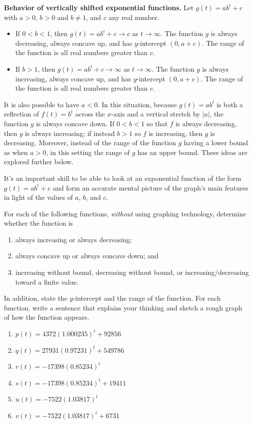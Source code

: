 \documentclass[nooutcomes]{ximera}
\begin{document}
\begin{callout}
\textbf{\Large Behavior of vertically shifted exponential functions.}
Let $g(t) = ab^t + c$ with $a > 0$, $b > 0$ and $b \ne 1$, and $c$ any real number.
\begin{itemize}
\item If $0 < b < 1$, then $g(t) = ab^t + c \to c$ as $t \to \infty$.  The function $g$ is always decreasing, always concave up, and has $y$-intercept $(0,a+c)$.  The range of the function is all real numbers greater than $c$.
\item If $b > 1$, then $g(t) = ab^t + c \to \infty$ as $t \to \infty$.  The function $g$ is always increasing, always concave up, and has $y$-intercept $(0,a+c)$.  The range of the function is all real numbers greater than $c$.
\end{itemize}
\end{callout}


It is also possible to have $a < 0$.  In this situation, because $g(t) = ab^t$ is both a reflection of $f(t) = b^t$ across the $x$-axis and a vertical stretch by $|a|$, the function $g$ is always concave down.  If $0 < b < 1$ so that $f$ is always decreasing, then $g$ is always increasing; if instead $b > 1$ so $f$ is increasing, then $g$ is decreasing.  Moreover, instead of the range of the function $g$ having a lower bound as when $a > 0$, in this setting the range of $g$ has an upper bound.  These ideas are explored further below.

It's an important skill to be able to look at an exponential function of the form $g(t) = ab^t + c$ and form an accurate mental picture of the graph's main features in light of the values of $a$, $b$, and $c$.

\begin{exploration}
For each of the following functions, \emph{without} using graphing technology, determine whether the function is
\begin{enumerate}[label=\roman*.]
\item always increasing or always decreasing;
\item always concave up or always concave down; and
\item increasing without bound, decreasing without bound, or increasing/decreasing toward a finite value.
\end{enumerate}
In addition, state the $y$-intercept and the range of the function.  For each function, write a sentence that explains your thinking and sketch a rough graph of how the function appears.
\begin{enumerate}[label=\alph*.]
\item $p(t) = 4372 (1.000235)^t + 92856$
\item $q(t) = 27931 (0.97231)^t + 549786$
\item $r(t) = -17398 (0.85234)^t$
\item $s(t) = -17398 (0.85234)^t + 19411$%
\item $u(t) = -7522 (1.03817)^t$%
\item $v(t) = -7522 (1.03817)^t + 6731$%
\end{enumerate}
\end{exploration}
\end{document}
